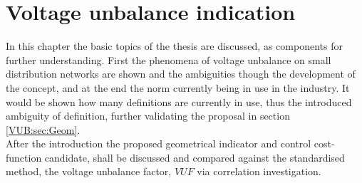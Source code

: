 \myemptypage
\chapter{Voltage unbalance indication}\label{BASIC:sec:main}

In this chapter the basic topics of the thesis are discussed, as components for further understanding. First the phenomena of voltage unbalance on small distribution networks are shown and the ambiguities though the development of the concept, and at the end the norm currently being in use in the industry. It would be shown how many definitions are currently in use, thus the introduced ambiguity of definition, further validating the proposal in section \ref{VUB:sec:Geom}.\\
After the introduction the proposed geometrical indicator and control cost-function candidate, shall be discussed and compared against the standardised method, the voltage unbalance factor, $VUF$ via correlation investigation.

